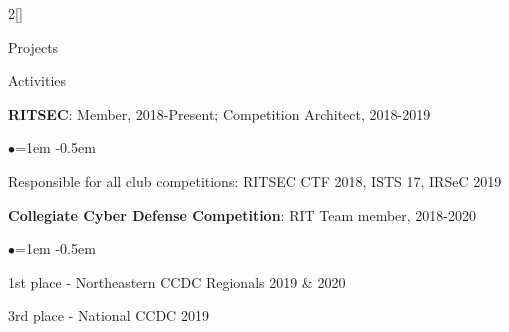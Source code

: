 \documentclass[8pt]{resume} %
\begin{document}
\begin{multicols}{2}[]
\begin{rSection}{Projects}


\end{rSection}

\columnbreak


\begin{rSection}{Activities}

    {\bf RITSEC}: Member, 2018-Present; Competition Architect, 2018-2019
    \begin{list}{$\bullet$}{\leftmargin=1em}
    \itemsep -0.5em \vspace{-0.5em}
    \item Responsible for all club competitions: RITSEC CTF 2018, ISTS 17,
        IRSeC 2019
    \end{list}


    {\bf Collegiate Cyber Defense Competition}: RIT Team member, 2018-2020
    \begin{list}{$\bullet$}{\leftmargin=1em}
    \itemsep -0.5em \vspace{-0.5em}
    \item 1st place - Northeastern CCDC Regionals 2019 \& 2020
    \item 3rd place - National CCDC 2019
    \end{list}



\end{rSection}
\end{multicols}
\end{document}
